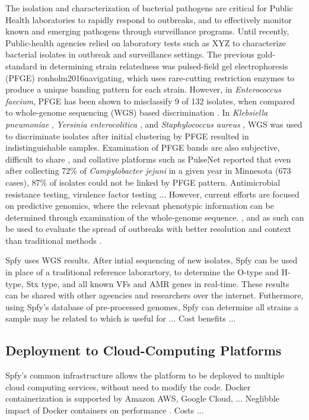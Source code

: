 \documentclass[a4,center,fleqn]{NAR}
\begin{document}
The isolation and characterization of bacterial pathogens are critical for Public Health laboratories to rapidly respond to outbreaks, and to effectively monitor known and emerging pathogens through surveillance programs.
Until recently, Public-health agencies relied on laboratory tests such as XYZ to characterize bacterial isolates in outbreak and surveillance settings.
The previous gold-standard in determining strain relatedness was pulsed-field gel electrophoresis (PFGE) {ronholm2016navigating}, which uses rare-cutting restriction enzymes to produce a unique banding pattern for each strain.
However, in \textit{Enterococcus faecium}, PFGE has been shown to misclassify 9 of 132 isolates, when compared to whole-genome sequencing (WGS) based discrimination \cite{pinholt2015multiple}.
In \textit{Klebsiella pneumoniae} \cite{marsh2015genomic}, \textit{Yersinia enterocolitica} \cite{gilpin2014limitations}, and \textit{Staphylococcus aureus} \cite{doi:10.1093/ofid/ofu096}, WGS was used to discriminate isolates after initial clustering by PFGE resulted in indistinguishable samples.
Examination of PFGE bands are also subjective, difficult to share \cite{lytsy2017time}, and collative platforms such as PulseNet reported \cite{gilpin2014limitations} that even after collecting 72\% of \textit{Campylobacter jejuni} in a given year in Minnesota (673 cases), 87\% of isolates could not be linked by PFGE pattern.
Antimicrobial resistance testing, virulence factor testing ...
However, current efforts are focused on predictive genomics, where the relevant phenotypic information can be determined through examination of the whole-genome sequence. 
, and as such can be used to evaluate the spread of outbreaks with better resolution and context than traditional methods \cite{ronholm2016navigating}.

Spfy uses WGS results.
After intial sequencing of new isolates, Spfy can be used in place of a traditional reference laborartory, to determine the O-type and H-type, Stx type, and all known VFs and AMR genes in real-time.
These results can be shared with other ageencies and researchers over the internet.
Futhermore, using Spfy's database of pre-processed genomes, Spfy can determine all strains a sample may be related to which is useful for ...
Cost benefits ...

\subsection{Deployment to Cloud-Computing Platforms}
Spfy's common infrastructure allows the platform to be deployed to multiple cloud computing services, without need to modify the code.
Docker containerization is supported by Amazon AWS, Google Cloud, ...
Neglibble impact of Docker containers on performance \cite{di2015impact}.
Costs ...
\end{document}
